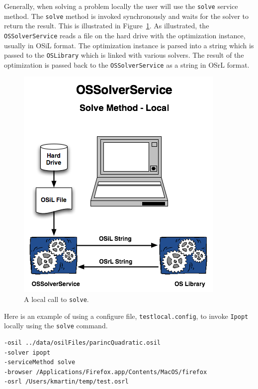 \documentclass[11pt]{article}
\newcommand{\figurepath}{./figures}
\newcounter{Fig}
\renewcommand{\_}{{\char"5F}}
\renewcommand{\{}{{\char"7B}}
\renewcommand{\}}{{\char"7D}}
\renewcommand{\^}{{\char"0D}}
\renewcommand{\'}{{\char"0D}}
\begin{document}
\begin{enumerate}[Step 1:]
Generally, when solving a problem locally the user will use the {\tt solve} service method. 
The {\tt solve} method is invoked synchronously and waits for the solver to return the result.  This is illustrated 
in Figure~\ref{figure:ossolverservicelocal}. As illustrated, the {\tt OSSolverService} reads a file on the hard drive 
with the optimization instance, usually in OSiL format. The optimization instance is parsed into a string 
which is passed to the {\tt OSLibrary} which is linked with various solvers. 
The result of the optimization is passed back to the {\tt OSSolverService} as a string in OSrL format.



\begin{figure}
\centering
\includegraphics[scale=0.5]{./figures/OSSolverServiceLocal.png}
\caption{A local call to {\tt solve}.}
\label{figure:ossolverservicelocal}
\end{figure}



Here is an example of using a configure file,  {\tt testlocal.config}, 
to invoke {\tt Ipopt} locally using the {\tt solve} command.

\begin{verbatim}
-osil ../data/osilFiles/parincQuadratic.osil
-solver ipopt
-serviceMethod solve
-browser /Applications/Firefox.app/Contents/MacOS/firefox
-osrl /Users/kmartin/temp/test.osrl
\end{verbatim}




\end{enumerate}
\end{document}

